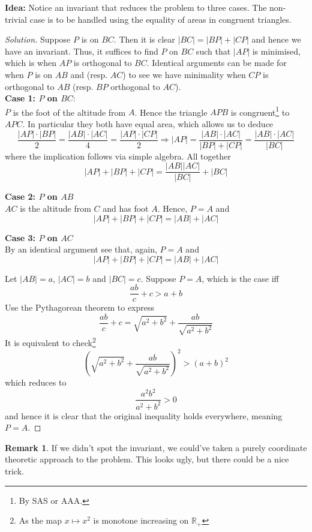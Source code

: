 \documentclass[11pt]{article}
\theoremstyle{definition}
\newtheorem*{remark}{Remark}
\begin{document}
{\bf Idea:} Notice an invariant that reduces the problem to three cases. The non-trivial case is to be handled using 
the equality of areas in congruent triangles. 

\begin{proof}[Solution]
    Suppose $P$ is on $BC$. Then it is clear $|BC| = |BP| + |CP|$ and hence we have an invariant. Thus, it suffices 
    to find $P$ on $BC$ such that $|AP|$ is minimised, which is when $AP$ is orthogonal to $BC$. Identical 
    arguments can be made for when $P$ is on $AB$ and (resp. $AC$) to see we have minimality when $CP$ is orthogonal 
    to $AB$ (resp. $BP$ orthogonal to $AC$). \\ 

    {\bf Case 1: $P$ on $BC$}: \\
    $P$ is the foot of the altitude from $A$. Hence the triangle $APB$ is congruent\footnote{By SAS or AAA.} to 
    $APC$. In particular they both have equal area, which allows us to deduce
    \[\frac{|AP| \cdot |BP|}{2} = \frac{|AB| \cdot |AC|}{4} = \frac{|AP| \cdot |CP|}{2} \Longrightarrow 
    |AP| = \frac{|AB| \cdot |AC|}{|BP| + |CP|} = \frac{|AB| \cdot |AC|}{|BC|}\]
    where the implication follows via simple algebra. All together 
    \[|AP| + |BP| + |CP| = \frac{|AB||AC|}{|BC|} + |BC|\]

    {\bf Case 2: $P$ on $AB$} \\
    $AC$ is the altitude from $C$ and has foot $A$. Hence, $P = A$ and
    \[|AP| + |BP| + |CP| = |AB| + |AC|\]

    {\bf Case 3: $P$ on $AC$} \\
    By an identical argument see that, again, $P = A$ and
    \[|AP| + |BP| + |CP| = |AB| + |AC|\]

    Let $|AB| = a$, $|AC| = b$ and $|BC| = c$. Suppose $P = A$, which is the case iff
    \[\frac{ab}{c} + c > a + b\]
    Use the Pythagorean theorem to express
    \[\frac{ab}{c} + c = \sqrt{a^2 + b^2} + \frac{ab}{\sqrt{a^2 + b^2}}\]
    It is equivalent to check\footnote{As the map $x \mapsto x^2$ is monotone increasing on $\mathbb{R}_+$}
    \[\left(\sqrt{a^2 + b^2} + \frac{ab}{\sqrt{a^2 + b^2}}\right)^2 > (a+b)^2\]
    which reduces to 
    \[\frac{a^2b^2}{a^2 + b^2} > 0\]
    and hence it is clear that the original inequality holds everywhere, meaning $P = A$.
\end{proof}

\begin{remark}
    If we didn't spot the invariant, we could've taken a purely coordinate theoretic approach to the problem. This 
    looks ugly, but there could be a nice trick.
\end{remark}
\end{document}
